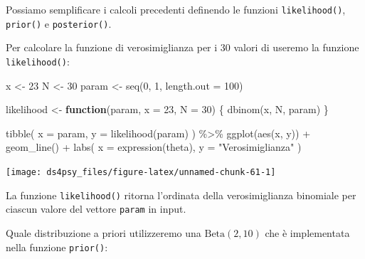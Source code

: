\documentclass[
  11pt,
]{krantz}
\makeatletter
\newenvironment{Shaded}{\begin{snugshade}}{\end{snugshade}}
\newcommand{\AttributeTok}[1]{\textcolor[rgb]{0.61,0.61,0.61}{#1}}
\newcommand{\ControlFlowTok}[1]{\textcolor[rgb]{0.27,0.27,0.27}{\textbf{#1}}}
\newcommand{\DecValTok}[1]{\textcolor[rgb]{0.06,0.06,0.06}{#1}}
\newcommand{\FunctionTok}[1]{\textcolor[rgb]{0,0,0}{#1}}
\newcommand{\NormalTok}[1]{#1}
\newcommand{\OtherTok}[1]{\textcolor[rgb]{0.37,0.37,0.37}{#1}}
\newcommand{\SpecialCharTok}[1]{\textcolor[rgb]{0,0,0}{#1}}
\newcommand{\StringTok}[1]{\textcolor[rgb]{0.5,0.5,0.5}{#1}}
\newenvironment{kframe}{%
\medskip{}
\setlength{\fboxsep}{.8em}
 \def\at@end@of@kframe{}%
 \ifinner\ifhmode%
  \def\at@end@of@kframe{\end{minipage}}%
  \begin{minipage}{\columnwidth}%
 \fi\fi%
 \def\FrameCommand##1{\hskip\@totalleftmargin \hskip-\fboxsep
 \colorbox{shadecolor}{##1}\hskip-\fboxsep
     \hskip-\linewidth \hskip-\@totalleftmargin \hskip\columnwidth}%
 \MakeFramed {\advance\hsize-\width
   \@totalleftmargin\z@ \linewidth\hsize
   \@setminipage}}%
 {\par\unskip\endMakeFramed%
 \at@end@of@kframe}
\renewenvironment{Shaded}{\begin{kframe}}{\end{kframe}}
\theoremstyle{definition}
\theoremstyle{definition}
\theoremstyle{definition}
\theoremstyle{definition}
\theoremstyle{remark}
\makeatother
\begin{document}
Possiamo semplificare i calcoli precedenti definendo le funzioni \texttt{likelihood()}, \texttt{prior()} e \texttt{posterior()}.

Per calcolare la funzione di verosimiglianza per i 30 valori di \citet{zetschefuture2019} useremo la funzione \texttt{likelihood()}:

\begin{Shaded}
\begin{Highlighting}[]
\NormalTok{x }\OtherTok{\textless{}{-}} \DecValTok{23}
\NormalTok{N }\OtherTok{\textless{}{-}} \DecValTok{30}
\NormalTok{param }\OtherTok{\textless{}{-}} \FunctionTok{seq}\NormalTok{(}\DecValTok{0}\NormalTok{, }\DecValTok{1}\NormalTok{, }\AttributeTok{length.out =} \DecValTok{100}\NormalTok{)}

\NormalTok{likelihood }\OtherTok{\textless{}{-}} \ControlFlowTok{function}\NormalTok{(param, }\AttributeTok{x =} \DecValTok{23}\NormalTok{, }\AttributeTok{N =} \DecValTok{30}\NormalTok{) \{}
  \FunctionTok{dbinom}\NormalTok{(x, N, param)}
\NormalTok{\}}

\FunctionTok{tibble}\NormalTok{(}
  \AttributeTok{x =}\NormalTok{ param, }
  \AttributeTok{y =} \FunctionTok{likelihood}\NormalTok{(param)}
\NormalTok{) }\SpecialCharTok{\%\textgreater{}\%}
  \FunctionTok{ggplot}\NormalTok{(}\FunctionTok{aes}\NormalTok{(x, y)) }\SpecialCharTok{+}
  \FunctionTok{geom\_line}\NormalTok{() }\SpecialCharTok{+}
  \FunctionTok{labs}\NormalTok{(}
    \AttributeTok{x =} \FunctionTok{expression}\NormalTok{(theta),}
    \AttributeTok{y =} \StringTok{"Verosimiglianza"}
\NormalTok{  )}
\end{Highlighting}
\end{Shaded}

\begin{center}\texttt{[image: ds4psy\_files/figure-latex/unnamed-chunk-61-1]} \end{center}

La funzione \texttt{likelihood()} ritorna l'ordinata della verosimiglianza binomiale per ciascun valore del vettore \texttt{param} in input.

Quale distribuzione a priori utilizzeremo una \(\mbox{Beta}(2, 10)\) che è implementata nella funzione \texttt{prior()}:
\end{document}
